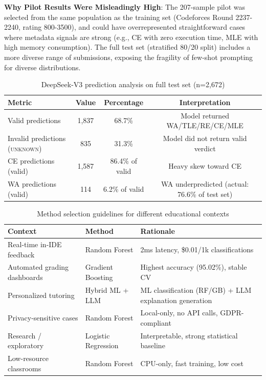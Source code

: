\documentclass[10pt,a4paper]{article}
\begin{document}
\textbf{Why Pilot Results Were Misleadingly High}: The 207-sample pilot was selected from the same population as the training set (Codeforces Round 2237-2240, rating 800-3500), and could have overrepresented straightforward cases where metadata signals are strong (e.g., CE with zero execution time, MLE with high memory consumption). The full test set (stratified 80/20 split) includes a more diverse range of submissions, exposing the fragility of few-shot prompting for diverse distributions.

\begin{table}[htbp]
\centering
\caption{DeepSeek-V3 prediction analysis on full test set (n=2,672)}
\label{tab:deepseek-analysis}
\begin{tabular}{@{}lccc@{}}
\toprule
\textbf{Metric} & \textbf{Value} & \textbf{Percentage} & \textbf{Interpretation} \\
\midrule
Valid predictions          & 1,837 & 68.7\% & Model returned WA/TLE/RE/CE/MLE \\
Invalid predictions (\textsc{unknown}) & 835   & 31.3\% & Model did not return valid verdict \\
\midrule
CE predictions (valid)    & 1,587 & 86.4\% of valid & Heavy skew toward CE \\
WA predictions (valid)    & 114   & 6.2\% of valid  & WA underpredicted (actual: 76.6\% of test set) \\
\bottomrule
\end{tabular}
\end{table}


\begin{table}[htbp]
\centering
\caption{Method selection guidelines for different educational contexts}
\label{tab:guidelines}
\begin{tabular}{>{\raggedright\arraybackslash}p{2.8cm}>{\raggedright\arraybackslash}p{2.8cm}>{\raggedright\arraybackslash}p{6.4cm}}
\toprule
\textbf{Context} & \textbf{Method} & \textbf{Rationale} \\
\midrule
Real-time in-IDE feedback & Random Forest & 2ms latency, \$0.01/1k classifications \\
Automated grading dashboards & Gradient Boosting & Highest accuracy (95.02\%), stable CV \\
Personalized tutoring & Hybrid ML + LLM & ML classification (RF/GB) + LLM explanation generation \\
Privacy-sensitive cases & Random Forest & Local-only, no API calls, GDPR-compliant \\
Research / exploratory & Logistic Regression & Interpretable, strong statistical baseline \\
Low-resource classrooms & Random Forest & CPU-only, fast training, low cost \\
\bottomrule
\end{tabular}
\end{table}
\end{document}
